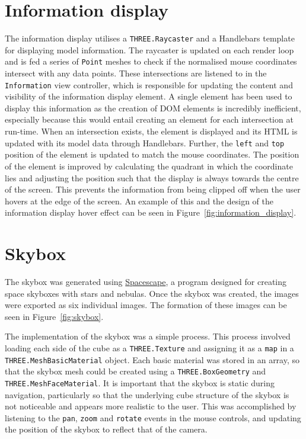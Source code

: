 \section{Information display} {
\label{sec:information_display}

	The information display utilises a \texttt{THREE.Raycaster} and a Handlebars template for displaying model information. The raycaster is updated on each render loop and is fed a series of \texttt{Point} meshes to check if the normalised mouse coordinates intersect with any data points. These intersections are listened to in the \texttt{Information} view controller, which is responsible for updating the content and visibility of the information display element. A single element has been used to display this information as the creation of DOM elements is incredibly inefficient, especially because this would entail creating an element for each intersection at run-time. When an intersection exists, the element is displayed and its HTML is updated with its model data through Handlebars. Further, the \texttt{left} and \texttt{top} position of the element is updated to match the mouse coordinates. The position of the element is improved by calculating the quadrant in which the coordinate lies and adjusting the position such that the display is always towards the centre of the screen. This prevents the information from being clipped off when the user hovers at the edge of the screen. An example of this and the design of the information display hover effect can be seen in Figure~\ref{fig:information_display}.

	

}

\section{Skybox} {
\label{sec:skybox}

	The skybox was generated using \href{http://alexcpeterson.com/spacescape/}{Spacescape}, a program designed for creating space skyboxes with stars and nebulas. Once the skybox was created, the images were exported as six individual images. The formation of these images can be seen in Figure~\ref{fig:skybox}.

	

	The implementation of the skybox was a simple process. This process involved loading each side of the cube as a \texttt{THREE.Texture} and assigning it as a \texttt{map} in a \texttt{THREE.MeshBasicMaterial} object. Each basic material was stored in an array, so that the skybox mesh could be created using a \texttt{THREE.BoxGeometry} and \texttt{THREE.MeshFaceMaterial}. It is important that the skybox is static during navigation, particularly so that the underlying cube structure of the skybox is not noticeable and appears more realistic to the user. This was accomplished by listening to the \texttt{pan}, \texttt{zoom} and \texttt{rotate} events in the mouse controls, and updating the position of the skybox to reflect that of the camera.

}

